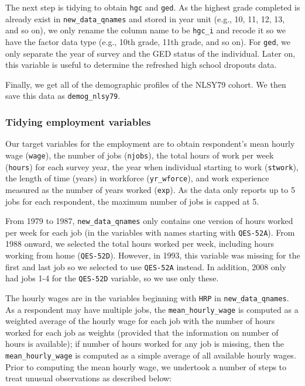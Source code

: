\documentclass{article}
\begin{document}
The next step is tidying to obtain \texttt{hgc} and \texttt{ged}. As the highest grade completed is already exist in \texttt{new\_data\_qnames} and stored in year unit (e.g., 10, 11, 12, 13, and so on), we only rename the column name to be \texttt{hgc\_i} and recode it so we have the factor data type (e.g., 10th grade, 11th grade, and so on). For \texttt{ged}, we only separate the year of survey and the GED status of the individual. Later on, this variable is useful to determine the refreshed high school dropouts data.

Finally, we get all of the demographic profiles of the NLSY79 cohort. We then save this data as \texttt{demog\_nlsy79}.

\hypertarget{tidyemp}{%
\subsubsection{Tidying employment variables}\label{tidyemp}}

Our target variables for the employment are to obtain respondent's mean hourly wage (\texttt{wage}), the number of jobs (\texttt{njobs}), the total hours of work per week (\texttt{hours}) for each survey year, the year when individual starting to work (\texttt{stwork}), the length of time (years) in workforce (\texttt{yr\_wforce}), and work experience measured as the number of years worked (\texttt{exp}). As the data only reports up to 5 jobs for each respondent, the maximum number of jobs is capped at 5.

From 1979 to 1987, \texttt{new\_data\_qnames} only contains one version of hours worked per week for each job (in the variables with names starting with \texttt{QES-52A}). From 1988 onward, we selected the total hours worked per week, including hours working from home (\texttt{QES-52D}). However, in 1993, this variable was missing for the first and last job so we selected to use \texttt{QES-52A} instead. In addition, 2008 only had jobs 1-4 for the \texttt{QES-52D} variable, so we use only these.

The hourly wages are in the variables beginning with \texttt{HRP} in \texttt{new\_data\_qnames}. As a respondent may have multiple jobs, the \texttt{mean\_hourly\_wage} is computed as a weighted average of the hourly wage for each job with the number of hours worked for each job as weights (provided that the information on number of hours is available); if number of hours worked for any job is missing, then the \texttt{mean\_hourly\_wage} is computed as a simple average of all available hourly wages. Prior to computing the mean hourly wage, we undertook a number of steps to treat unusual observations as described below:
\end{document}
